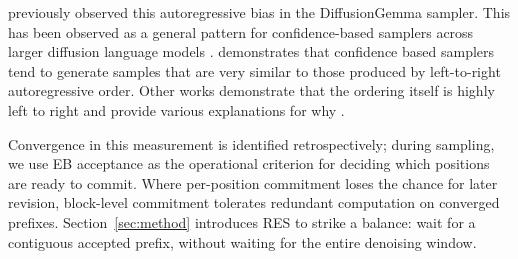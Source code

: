 \citet{asaria2026neither} previously observed this autoregressive bias in the DiffusionGemma sampler.
This has been observed as a general pattern for confidence-based samplers across larger diffusion language models \citep{kim2026interface, gong2026diffucoder, lu2026adablock, yao2026decoding}.
\citet{kim2026interface} demonstrates that confidence based samplers tend to generate samples that are very similar to those produced by left-to-right autoregressive order.
Other works demonstrate that the ordering itself is highly left to right and provide various explanations for why \citep{gong2026diffucoder, lu2026adablock, yao2026decoding}.

Convergence in this measurement is identified retrospectively; during sampling, we use EB acceptance as the operational criterion for deciding which positions are ready to commit.
Where per-position commitment loses the chance for later revision, block-level commitment tolerates redundant computation on converged prefixes. Section~\ref{sec:method} introduces RES to strike a balance: wait for a contiguous accepted prefix, without waiting for the entire denoising window.
